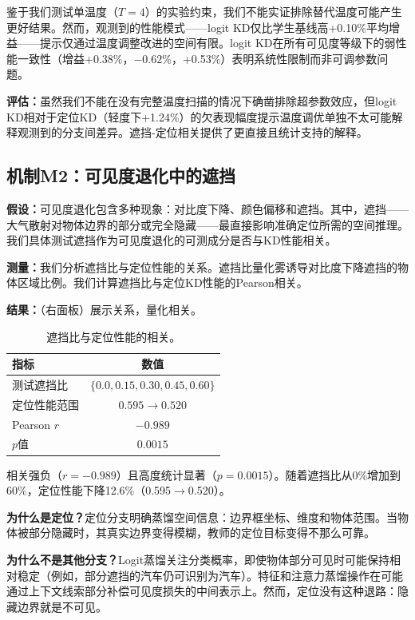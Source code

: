 鉴于我们测试单温度（$T=4$）的实验约束，我们不能实证排除替代温度可能产生更好结果。然而，观测到的性能模式——logit KD仅比学生基线高+0.10\%平均增益——提示仅通过温度调整改进的空间有限。logit KD在所有可见度等级下的弱性能一致性（增益+0.38\%，$-0.62$\%，+0.53\%）表明系统性限制而非可调参数问题。

\textbf{评估：}虽然我们不能在没有完整温度扫描的情况下确凿排除超参数效应，但logit KD相对于定位KD（轻度下+1.24\%）的欠表现幅度提示温度调优单独不太可能解释观测到的分支间差异。遮挡-定位相关提供了更直接且统计支持的解释。

\subsection{机制M2：可见度退化中的遮挡}

\textbf{假设：}可见度退化包含多种现象：对比度下降、颜色偏移和遮挡。其中，遮挡——大气散射对物体边界的部分或完全隐藏——最直接影响准确定位所需的空间推理。我们具体测试遮挡作为可见度退化的可测成分是否与KD性能相关。

\textbf{测量：}我们分析遮挡比与定位性能的关系。遮挡比量化雾诱导对比度下降遮挡的物体区域比例。我们计算遮挡比与定位KD性能的Pearson相关。

\textbf{结果：}（右面板）展示关系，量化相关。

\begin{table}[htbp]
\centering
\caption{遮挡比与定位性能的相关。}
\label{tab:occlusion_corr}
\begin{tabular}{@{}lc@{}}
\toprule
指标 & 数值 \\
\midrule
测试遮挡比 & $\{0.0, 0.15, 0.30, 0.45, 0.60\}$ \\
定位性能范围 & $0.595 \to 0.520$ \\
Pearson $r$ & $\mathbf{-0.989}$ \\
$p$值 & $\mathbf{0.0015}$ \\
\bottomrule
\end{tabular}
\end{table}

相关强负（$r = -0.989$）且高度统计显著（$p = 0.0015$）。随着遮挡比从0\%增加到60\%，定位性能下降12.6\%（0.595$\to$0.520）。

\textbf{为什么是定位？}定位分支明确蒸馏空间信息：边界框坐标、维度和物体范围。当物体被部分隐藏时，其真实边界变得模糊，教师的定位目标变得不那么可靠。

\textbf{为什么不是其他分支？}Logit蒸馏关注分类概率，即使物体部分可见时可能保持相对稳定（例如，部分遮挡的汽车仍可识别为汽车）。特征和注意力蒸馏操作在可能通过上下文线索部分补偿可见度损失的中间表示上。然而，定位没有这种退路：隐藏边界就是不可见。

